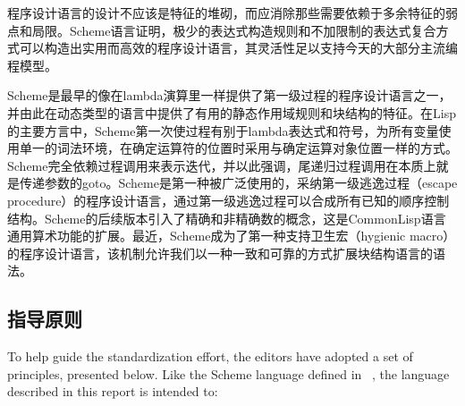 
\label{historysection}

程序设计语言的设计不应该是特征的堆砌，而应消除那些需要依赖于多余特征的弱点和局限。Scheme语言证明，极少的表达式构造规则和不加限制的表达式复合方式可以构造出实用而高效的程序设计语言，其灵活性足以支持今天的大部分主流编程模型。

Scheme是最早的像在lambda演算里一样提供了第一级过程的程序设计语言之一，并由此在动态类型的语言中提供了有用的静态作用域规则和块结构的特征。在Lisp的主要方言中，Scheme第一次使过程有别于lambda表达式和符号，为所有变量使用单一的词法环境，在确定运算符的位置时采用与确定运算对象位置一样的方式。Scheme完全依赖过程调用来表示迭代，并以此强调，尾递归过程调用在本质上就是传递参数的goto。Scheme是第一种被广泛使用的，采纳第一级逃逸过程（escape procedure）的程序设计语言，通过第一级逃逸过程可以合成所有已知的顺序控制结构。Scheme的后续版本引入了精确和非精确数的概念，这是CommonLisp语言通用算术功能的扩展。最近，Scheme成为了第一种支持卫生宏（hygienic macro）的程序设计语言，该机制允许我们以一种一致和可靠的方式扩展块结构语言的语法。

\subsection*{指导原则}

To help guide the standardization effort, the editors have adopted a
set of principles, presented below.
Like the Scheme language defined in ~\cite{R5RS}, the language described
in this report is intended to:

